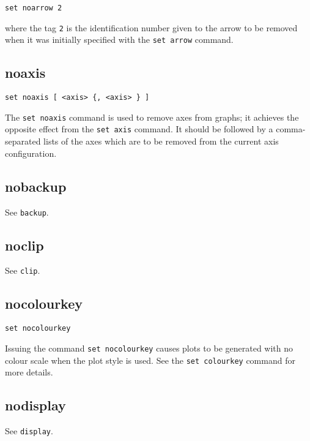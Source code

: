 \begin{verbatim}
set noarrow 2
\end{verbatim}

\noindent where the tag {\tt 2} is the identification number given to the arrow
to be removed when it was initially specified with the {\tt set arrow} command.


\subsection{noaxis}

\begin{verbatim}
set noaxis [ <axis> {, <axis> } ]
\end{verbatim}

The {\tt set noaxis} command is used to remove axes from graphs; it achieves
the opposite effect from the {\tt set axis} command. It should be followed by a
comma-separated lists of the axes which are to be removed from the current axis
configuration.


\subsection{nobackup}

See {\tt backup}.


\subsection{noclip}

See {\tt clip}.


\subsection{nocolourkey}

\begin{verbatim}
set nocolourkey
\end{verbatim}

Issuing the command {\tt set nocolourkey} causes plots to be generated with no
colour scale when the  plot style is used. See the {\tt set
colourkey} command for more details.


\subsection{nodisplay}

See {\tt display}.


